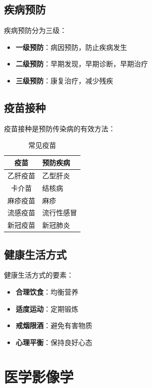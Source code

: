 \documentclass[12pt,UTF8]{ctexbook}
\begin{document}
\section{疾病预防}
\label{sec:disease_prevention}

疾病预防分为三级：
\begin{itemize}
    \item \textbf{一级预防}：病因预防，防止疾病发生
    \item \textbf{二级预防}：早期发现，早期诊断，早期治疗
    \item \textbf{三级预防}：康复治疗，减少残疾
\end{itemize}

\section{疫苗接种}
\label{sec:vaccination}

疫苗接种是预防传染病的有效方法：
\begin{table}[htbp]
    \centering
    \caption{常见疫苗}
    \begin{tabular}{|c|p{8cm}|}
        \hline
        \textbf{疫苗} & \textbf{预防疾病} \\
        \hline
        乙肝疫苗 & 乙型肝炎 \\
        \hline
        卡介苗 & 结核病 \\
        \hline
        麻疹疫苗 & 麻疹 \\
        \hline
        流感疫苗 & 流行性感冒 \\
        \hline
        新冠疫苗 & 新冠肺炎 \\
        \hline
    \end{tabular}
\end{table}

\section{健康生活方式}
\label{sec:healthy_lifestyle}

健康生活方式的要素：
\begin{itemize}
    \item \textbf{合理饮食}：均衡营养
    \item \textbf{适度运动}：定期锻炼
    \item \textbf{戒烟限酒}：避免有害物质
    \item \textbf{心理平衡}：保持良好心态
\end{itemize}

\chapter{医学影像学}
\label{chap:medical_imaging}
\end{document}
